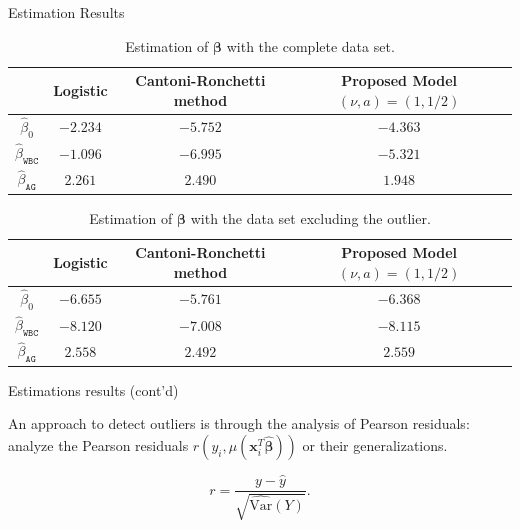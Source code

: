 \documentclass{beamer}
\begin{document}
\begin{frame}{Estimation Results}

\begin{table}[H]
  \footnotesize
  \centering
  \caption{Estimation of $\bm{\beta}$ with the complete data set.}
  \begin{tabular}{|c|c|c|c|}
  \hline
                             &  Logistic          &  Cantoni-Ronchetti method    & Proposed Model $(\nu, a)=(1, 1/2)$   \\ 
  \hline

  $\hat{\beta}_{0}$        &  $-2.234$     &   $-5.752$   & $-4.363$       \\
  $\hat{\beta}_{\texttt{WBC}}$        &  $-1.096$     &    $-6.995$  & $-5.321$      \\
  $\hat{\beta}_{\texttt{AG}}$        &  $2.261$       &   $2.490$  & $1.948$        \\
  \hline
  \end{tabular}
  \label{tab:beta_estimation_complete}
\end{table}

\begin{table}[H]
  \footnotesize
  \centering
  \caption{Estimation of $\bm{\beta}$ with the data set excluding the outlier.}
  \begin{tabular}{|c|c|c|c|}
  \hline
                             &  Logistic          &  Cantoni-Ronchetti method    & Proposed Model $(\nu, a)=(1, 1/2)$   \\ 
  \hline

  $\hat{\beta}_{0}$        &  $-6.655$     &   $-5.761$   & $-6.368$       \\
  $\hat{\beta}_{\texttt{WBC}}$        &  $-8.120$     &    $-7.008$  & $-8.115$      \\
  $\hat{\beta}_{\texttt{AG}}$        &  $2.558$       &   $2.492$  & $2.559$        \\
  \hline
  \end{tabular}
  \label{tab:beta_estimation_exclude}
\end{table}

\end{frame}

\begin{frame}{Estimations results (cont'd)}

    An approach to detect outliers is through the analysis of Pearson residuals:
    analyze the Pearson residuals $r(y_i, \mu(\bm{x}_i^T \hat{\bm{\beta}}))$
     or their generalizations.

\begin{equation*}
  r = \frac{y-\hat{y}}{
    \sqrt{\hat{\text{Var}}(Y)}}.
\end{equation*}

\end{frame}
\end{document}
